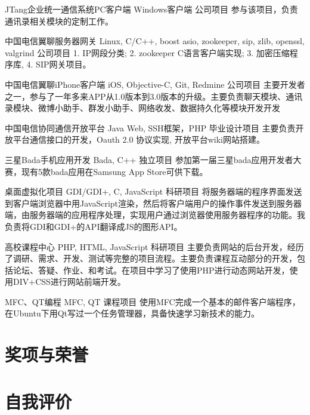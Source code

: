\documentclass[11pt,a4paper]{moderncv}
\begin{document}
\vspace*{0.2\baselineskip}
{JTang企业统一通信系统PC客户端}
{Windows客户端}
{公司项目}{}
{参与该项目，负责通讯录相关模块的定制工作。}

\vspace*{0.2\baselineskip}
{中国电信翼聊服务器网关}
{Linux, C/C++, boost asio, zookeeper, sip, zlib, openssl, valgrind}
{公司项目}{}
{1. IP网段分类; 2. zookeeper C语言客户端实现; 3. 加密压缩程序库, 4. SIP网关项目。}

\vspace*{0.2\baselineskip}
{中国电信翼聊iPhone客户端}
{iOS, Objective-C, Git, Redmine}
{公司项目}{}
{主要开发者之一，参与了一年多来APP从1.0版本到3.0版本的升级。主要负责聊天模块、通讯录模块、微博小助手、群发小助手、网络收发、数据持久化等模块开发开发}

\vspace*{0.2\baselineskip}
{中国电信协同通信开放平台}
{Java Web, SSH框架，PHP}
{毕业设计项目}{}
{主要负责开放平台通信接口的开发，Oauth 2.0 协议实现, 开放平台wiki网站搭建。}

\vspace*{0.2\baselineskip}
{三星Bada手机应用开发}
{Bada, C++}
{独立项目}{}
{参加第一届三星bada应用开发者大赛，现有5款bada应用在Samsung App Store可供下载。}

\vspace*{0.2\baselineskip}
{桌面虚拟化项目}
{GDI/GDI+, C, JavaScript}
{科研项目}{}
{将服务器端的程序界面发送到客户端浏览器中用JavaScript渲染，然后将客户端用户的操作事件发送到服务器端，由服务器端的应用程序处理，实现用户通过浏览器使用服务器程序的功能。我负责将GDI和GDI+的API翻译成JS的图形API。}

\vspace*{0.2\baselineskip}
{高校课程中心}
{PHP, HTML, JavaScript}
{科研项目}{}
{主要负责网站的后台开发，经历了调研、需求、开发、测试等完整的项目流程。主要负责课程互动部分的开发，包括论坛、答疑、作业、和考试。在项目中学习了使用PHP进行动态网站开发，使用DIV+CSS进行网站前端开发。}

\vspace*{0.2\baselineskip}
{MFC、QT编程}
{MFC, QT}
{课程项目}{}
{使用MFC完成一个基本的邮件客户端程序，在Ubuntu下用Qt写过一个任务管理器，具备快速学习新技术的能力。}

\renewcommand{\baselinestretch}{1.0}

\section{奖项与荣誉}

\section{自我评价}

\closesection{}                   %
\renewcommand{\listitemsymbol}{-} %
\end{document}
